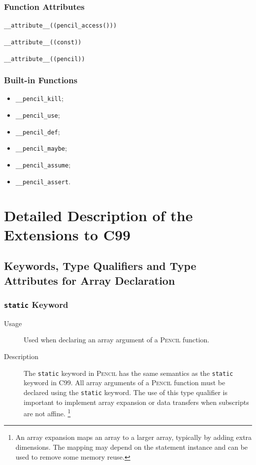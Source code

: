 \documentclass{carp}
\newcommand\pencil{\textsc{Pencil}\xspace}
\begin{document}
\subsection*{Function Attributes}

\begin{description}
  \item \lstinline!__attribute__((pencil_access()))!
  \item \lstinline!__attribute__((const))!
  \item \lstinline!__attribute__((pencil))!
\end{description}

\subsection*{Built-in Functions}

\begin{itemize}
\item \lstinline!__pencil_kill!;
\item \lstinline!__pencil_use!;
\item \lstinline!__pencil_def!;
\item \lstinline!__pencil_maybe!;
\item \lstinline!__pencil_assume!;
\item \lstinline!__pencil_assert!.
\end{itemize}

\chapter{Detailed Description of the Extensions to C99}
\label{sec:Annotations-and-directives}

\section{Keywords, Type Qualifiers and Type Attributes for Array Declaration}
\label{sec:array-type-qualifiers-section}

\subsection{\lstinline!static! Keyword}
\label{sec:static}

\begin{description}
\item [Usage] Used when declaring an array argument of a \pencil function.
\item [Description] The \lstinline!static! keyword in \pencil
has the same semantics as the \lstinline!static! keyword in C99.
All array arguments of a \pencil function
must be declared using the \lstinline!static! keyword.
The use of this type qualifier is
important to implement array expansion or data transfers when
subscripts are not affine.%
\footnote{An array expansion maps an array to a larger array, typically
by adding extra dimensions.  The mapping may depend on the statement
instance and can be used to remove some memory reuse.}
\end{description}
\end{document}
